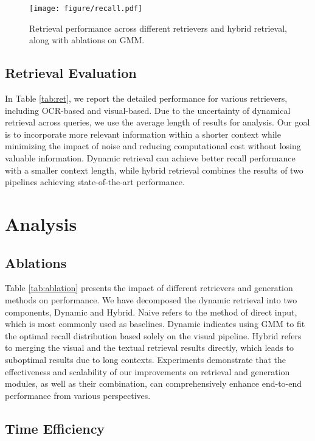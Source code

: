 
\begin{figure}[!h]
    \centering 
    \texttt{[image: figure/recall.pdf]}
    \caption{Retrieval performance across different retrievers and hybrid retrieval, along with ablations on GMM. 
    }
    \label{fig:ret}
\end{figure}

\subsection{Retrieval Evaluation}
In Table \ref{tab:ret}, we report the detailed performance for various retrievers, including OCR-based and visual-based. 
Due to the uncertainty of dynamical retrieval across queries, we use the average length of results for analysis.
Our goal is to incorporate more relevant information within a shorter context while minimizing the impact of noise and reducing computational cost without losing valuable information. 
Dynamic retrieval can achieve better recall performance with a smaller context length, while hybrid retrieval combines the results of two pipelines achieving state-of-the-art performance.

\section{Analysis}
\subsection{Ablations}
Table \ref{tab:ablation} presents the impact of different retrievers and generation methods on performance. We have decomposed the dynamic retrieval into two components, Dynamic and Hybrid. Naive refers to the method of direct input, which is most commonly used as baselines. Dynamic indicates using GMM to fit the optimal recall distribution based solely on the visual pipeline. Hybrid refers to merging the visual and the textual retrieval results directly, which leads to suboptimal results due to long contexts. Experiments demonstrate that the effectiveness and scalability of our improvements on retrieval and generation modules, as well as their combination, can comprehensively enhance end-to-end performance from various perspectives.



\subsection{Time Efficiency}
\label{sec:analysis:time}
